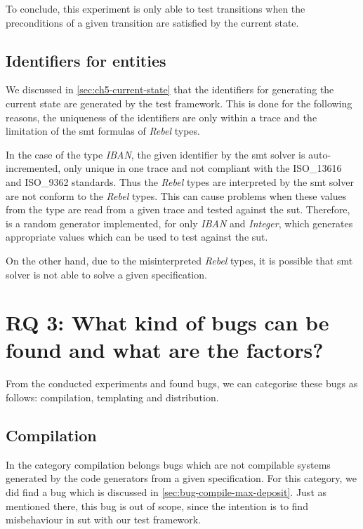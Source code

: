 To conclude, this experiment is only able to test transitions when the preconditions of a given transition are satisfied by the current state.


\subsection{Identifiers for entities}
We discussed in \autoref{sec:ch5-current-state} that the identifiers for generating the current state are generated by the test framework. This is done for the following reasons, the uniqueness of the identifiers are only within a trace and the limitation of the \gls{smt} formulas of \textit{Rebel} types.

In the case of the type \textit{IBAN}, the given identifier by the \gls{smt} solver is auto-incremented, only unique in one trace and not compliant with the ISO\_13616 and ISO\_9362 standards. Thus the \textit{Rebel} types are interpreted by the \gls{smt} solver are not conform to the \textit{Rebel} types. This can cause problems when these values from the type are read from a given trace and tested against the \gls{sut}. Therefore, is a random generator implemented, for only \textit{IBAN} and \textit{Integer}, which generates appropriate values which can be used to test against the \gls{sut}.

On the other hand, due to the misinterpreted \textit{Rebel} types, it is possible that \gls{smt} solver is not able to solve a given specification.


\section{RQ 3: What kind of bugs can be found and what are the factors?}

From the conducted experiments and found bugs, we can categorise these bugs as follows: compilation, templating and distribution.

\subsection{Compilation}
In the category compilation belongs bugs which are not compilable systems generated by the code generators from a given specification. For this category, we did find a bug which is discussed in \autoref{sec:bug-compile-max-deposit}. Just as mentioned there, this bug is out of scope, since the intention is to find misbehaviour in \gls{sut} with our test framework.


